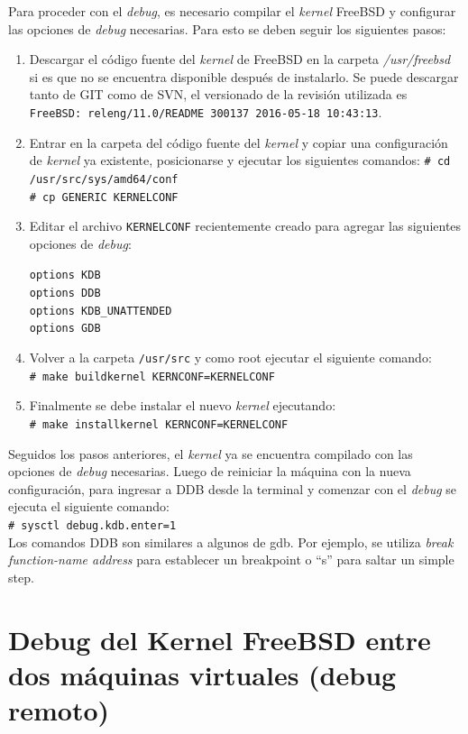 \documentclass[a4paper]{book}
\begin{document}
Para proceder con el \emph{debug}, es necesario compilar el \emph{kernel} FreeBSD y configurar las opciones de \emph{debug} necesarias. Para esto se deben seguir los siguientes pasos:
\begin{enumerate}
\item Descargar el c\'odigo fuente del \emph{kernel} de FreeBSD en la carpeta \emph{/usr/freebsd} si es que no se encuentra disponible despu\'es de instalarlo. Se puede descargar tanto de GIT como de SVN, el versionado de la revisi\'on utilizada es \verb|FreeBSD: releng/11.0/README 300137 2016-05-18 10:43:13|.
\item Entrar en la carpeta del c\'odigo fuente del \emph{kernel} y copiar una configuraci\'on de \emph{kernel} ya existente, posicionarse y ejecutar los siguientes comandos:
\verb|# cd /usr/src/sys/amd64/conf|\\
\verb|# cp GENERIC KERNELCONF|
\item Editar el archivo \verb|KERNELCONF| recientemente creado para agregar las siguientes opciones de \emph{debug}:
\begin{center}
\verb|options KDB|\\
\verb|options DDB|\\
\verb|options KDB_UNATTENDED|\\
\verb|options GDB|\\
\end{center}
\item Volver a la carpeta \verb|/usr/src| y como root ejecutar el siguiente comando:\\
\verb|# make buildkernel KERNCONF=KERNELCONF|
\item Finalmente se debe instalar el nuevo \emph{kernel} ejecutando:\\
\verb|# make installkernel KERNCONF=KERNELCONF|
\end{enumerate}

Seguidos los pasos anteriores, el \emph{kernel} ya se encuentra compilado con las opciones de \emph{debug} necesarias. Luego de reiniciar la máquina con la nueva configuración, para ingresar a DDB desde la terminal y comenzar con el \emph{debug} se ejecuta el siguiente comando:\\
\verb|# sysctl debug.kdb.enter=1|\\

Los comandos DDB son similares a algunos de gdb. Por ejemplo, se utiliza \emph{break function-name address} para establecer un breakpoint o “s” para saltar un simple step.

\section{Debug del Kernel FreeBSD entre dos m\'aquinas virtuales (debug remoto)}
\end{document}
